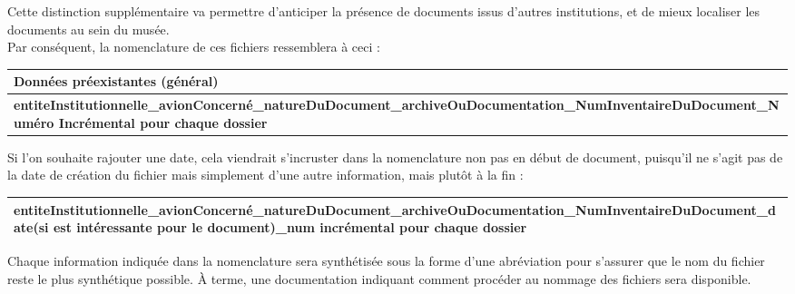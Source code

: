  Cette distinction supplémentaire va permettre d’anticiper la présence de documents issus d’autres institutions, et de mieux localiser les documents au sein du musée.\\

 Par conséquent, la nomenclature de ces fichiers ressemblera à ceci :\\

 \begin{center}
\begin{adjustbox}{width=0.85\textwidth} 
\begin{tabularx}{\textwidth}{|X|}
\hline
\textbf{Données préexistantes (général)} \\ \hline
\textbf{entiteInstitutionnelle\_avionConcerné\_natureDuDocument\linebreak \_archiveOuDocumentation\_NumInventaireDuDocument\_Numéro \linebreak Incrémental pour chaque dossier} \\ \hline
\end{tabularx}
\end{adjustbox}
\end{center}

Si l’on souhaite rajouter une date, cela viendrait s’incruster dans la nomenclature non pas en début de document, puisqu’il ne s’agit pas de la date de création du fichier mais simplement d’une autre information, mais plutôt à la fin :\\ 

 \begin{center}
\begin{adjustbox}{width=0.85\textwidth} 
\begin{tabularx}{\textwidth}{|X|}
\hline
\textbf{entiteInstitutionnelle\_avionConcerné\_natureDuDocument\linebreak \_archiveOuDocumentation\_NumInventaireDuDocument\linebreak \_date(si est intéressante pour le document)\_num incrémental pour chaque dossier} \\ \hline
\end{tabularx}
\end{adjustbox}
\end{center}

Chaque information indiquée dans la nomenclature sera synthétisée sous la forme d’une abréviation pour s’assurer que le nom du fichier reste le plus synthétique possible. À terme, une documentation indiquant comment procéder au nommage des fichiers sera disponible.
 
